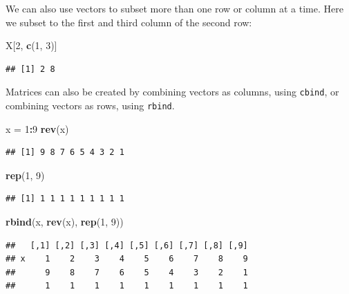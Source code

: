 \documentclass[]{book}
\newenvironment{Shaded}{\begin{snugshade}}{\end{snugshade}}
\newcommand{\KeywordTok}[1]{\textcolor[rgb]{0.13,0.29,0.53}{\textbf{#1}}}
\newcommand{\DecValTok}[1]{\textcolor[rgb]{0.00,0.00,0.81}{#1}}
\newcommand{\StringTok}[1]{\textcolor[rgb]{0.31,0.60,0.02}{#1}}
\newcommand{\OperatorTok}[1]{\textcolor[rgb]{0.81,0.36,0.00}{\textbf{#1}}}
\newcommand{\NormalTok}[1]{#1}
\begin{document}
We can also use vectors to subset more than one row or column at a time.
Here we subset to the first and third column of the second row:

\begin{Shaded}
\begin{Highlighting}[]
\NormalTok{X[}\DecValTok{2}\NormalTok{, }\KeywordTok{c}\NormalTok{(}\DecValTok{1}\NormalTok{, }\DecValTok{3}\NormalTok{)]}
\end{Highlighting}
\end{Shaded}

\begin{verbatim}
## [1] 2 8
\end{verbatim}

Matrices can also be created by combining vectors as columns, using
\texttt{cbind}, or combining vectors as rows, using \texttt{rbind}.

\begin{Shaded}
\begin{Highlighting}[]
\NormalTok{x =}\StringTok{ }\DecValTok{1}\OperatorTok{:}\DecValTok{9}
\KeywordTok{rev}\NormalTok{(x)}
\end{Highlighting}
\end{Shaded}

\begin{verbatim}
## [1] 9 8 7 6 5 4 3 2 1
\end{verbatim}

\begin{Shaded}
\begin{Highlighting}[]
\KeywordTok{rep}\NormalTok{(}\DecValTok{1}\NormalTok{, }\DecValTok{9}\NormalTok{)}
\end{Highlighting}
\end{Shaded}

\begin{verbatim}
## [1] 1 1 1 1 1 1 1 1 1
\end{verbatim}

\begin{Shaded}
\begin{Highlighting}[]
\KeywordTok{rbind}\NormalTok{(x, }\KeywordTok{rev}\NormalTok{(x), }\KeywordTok{rep}\NormalTok{(}\DecValTok{1}\NormalTok{, }\DecValTok{9}\NormalTok{))}
\end{Highlighting}
\end{Shaded}

\begin{verbatim}
##   [,1] [,2] [,3] [,4] [,5] [,6] [,7] [,8] [,9]
## x    1    2    3    4    5    6    7    8    9
##      9    8    7    6    5    4    3    2    1
##      1    1    1    1    1    1    1    1    1
\end{verbatim}
\end{document}
